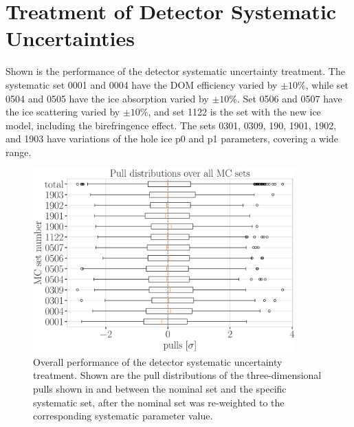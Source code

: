 \section{Treatment of Detector Systematic Uncertainties} 

Shown is the performance of the detector systematic uncertainty treatment. The systematic set 0001 and 0004 have the DOM efficiency varied by $\pm10\%$, while set 0504 and 0505 have the ice absorption varied by $\pm10\%$. Set 0506 and 0507 have the ice scattering varied by $\pm10\%$, and set 1122 is the set with the new ice model, including the birefringence effect. The sets 0301, 0309, 190, 1901, 1902, and 1903 have variations of the hole ice p0 and p1 parameters, covering a wide range.

\begin{figure}[h]
    \includegraphics[width=0.9\textwidth]{figures/results/utlrasurfaces/oscNext_leptoninjector_1.0_GeV_knn_probs_neighbors_500_weighted_nfiles_extended_holeice_corrected_grads_poly_2_weighted_reference_weight_0.0100_thesis_style-2.png}
    \caption[Detector systematic uncertainty treatment overall performance]{Overall performance of the detector systematic uncertainty treatment. Shown are the pull distributions of the three-dimensional pulls shown in  and  between the nominal set and the specific systematic set, after the nominal set was re-weighted to the corresponding systematic parameter value.}
\end{figure}

